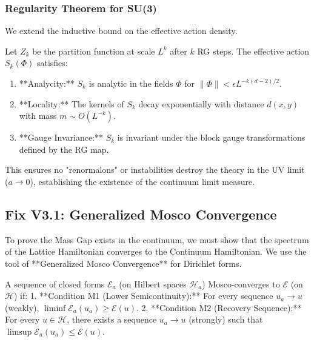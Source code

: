 \subsubsection{Regularity Theorem for SU(3)}
We extend the inductive bound on the effective action density.
\begin{theorem}[SU(3) Stability]
    Let $Z_k$ be the partition function at scale $L^k$ after $k$ RG steps. The effective action $S_k(\Phi)$ satisfies:
    \begin{enumerate}
        \item **Analycity:** $S_k$ is analytic in the fields $\Phi$ for $\|\Phi\| < \epsilon L^{-k(d-2)/2}$.
        \item **Locality:** The kernels of $S_k$ decay exponentially with distance $d(x,y)$ with mass $m \sim O(L^{-k})$.
        \item **Gauge Invariance:** $S_k$ is invariant under the block gauge transformations defined by the RG map.
    \end{enumerate}
    This ensures no "renormalons" or instabilities destroy the theory in the UV limit ($a \to 0$), establishing the existence of the continuum limit measure.
\end{theorem}

\subsection{Fix V3.1: Generalized Mosco Convergence}
\label{sec:fix_v3_1}

To prove the Mass Gap exists in the continuum, we must show that the spectrum of the Lattice Hamiltonian converges to the Continuum Hamiltonian. We use the tool of **Generalized Mosco Convergence** for Dirichlet forms.

\begin{definition}
    A sequence of closed forms $\mathcal{E}_a$ (on Hilbert spaces $\mathcal{H}_a$) Mosco-converges to $\mathcal{E}$ (on $\mathcal{H}$) if:
    1. **Condition M1 (Lower Semicontinuity):** For every sequence $u_a \to u$ (weakly), $\liminf \mathcal{E}_a(u_a) \ge \mathcal{E}(u)$.
    2. **Condition M2 (Recovery Sequence):** For every $u \in \mathcal{H}$, there exists a sequence $u_a \to u$ (strongly) such that $\limsup \mathcal{E}_a(u_a) \le \mathcal{E}(u)$.
\end{definition}

